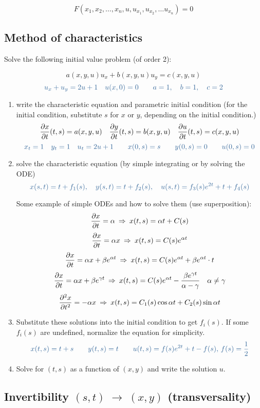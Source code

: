 \documentclass[a4paper]{article}
\begin{document}
\begin{twocolumn}
$$F(x_1,x_2,\ldots, x_n, u, u_{x_1}, u_{x_2}, \ldots u_{x_n}) = 0$$

\subsection{Method of characteristics}
Solve the following initial value problem (of order 2):

$$a(x,y,u) u_x + b(x,y,u) u_y = c(x,y,u)$$
$$\ex{u_x + u_y = 2u + 1 \quad u(x,0) = 0 \qquad a = 1, \quad b = 1, \quad c = 2}$$

\begin{enumerate}

\item write the characteristic equation and parametric initial condition (for the initial condition, substitute $s$ for $x$ or $y$, depending on the initial condition.)
$$\frac{\partial x}{\partial t}(t,s) = a(x,y,u) \quad \frac{\partial y}{\partial t}(t,s) = b(x,y,u) \quad \frac{\partial u}{\partial t}(t,s) = c(x,y,u)$$
$$\ex{x_t = 1 \quad y_t = 1 \quad u_t = 2u + 1 \qquad x(0,s) = s \qquad y(0,s) = 0 \qquad u(0,s) = 0}$$

\item solve the characteristic equation (by simple integrating or by solving the ODE)
$$\ex{x(s,t) = t + f_1(s), \quad y(s,t) = t + f_2(s), \quad u(s,t) = f_3(s) e^{2t} + t + f_4(s)}$$

Some example of simple ODEs and how to solve them (use superposition):
$$\frac{\partial x}{\partial t} = \alpha \: \Rightarrow \: x(t,s) = \alpha t + C(s)$$
$$\frac{\partial x}{\partial t} = \alpha x \: \Rightarrow \: x(t,s) = C(s) e^{\alpha t}$$
$$\frac{\partial x}{\partial t} = \alpha x + \beta e^{\alpha t} \: \Rightarrow \: x(t,s) = C(s) e^{\alpha t} + \beta e^{\alpha t} \cdot t$$
$$\frac{\partial x}{\partial t} = \alpha x + \beta e^{\gamma t} \: \Rightarrow \: x(t,s) = C(s) e^{\alpha t} - \frac{\beta e^{\gamma t}}{\alpha - \gamma} \quad \alpha \neq \gamma$$
$$\frac{\partial^2 x}{\partial t ^2} = -\alpha x \: \Rightarrow \: x(t,s) = C_1(s) \cos \alpha t + C_2(s) \sin \alpha t$$

\item Substitute these solutions into the initial condition to get $f_i(s)$. If some $f_i(s)$ are undefined, normalize the equation for simplicity.
$$\ex{x(t,s) = t + s \qquad y(t,s) = t \qquad u(t,s) = f(s) e^{2t} + t - f(s), \, f(s) = \frac{1}{2}}$$

\item Solve for $(t,s)$ as a function of $(x,y)$ and write the solution $u$.
\end{enumerate}


\subsection{Invertibility $(s,t) \;\rightarrow\; (x,y)$ (transversality)}


\end{twocolumn}
\end{document}
